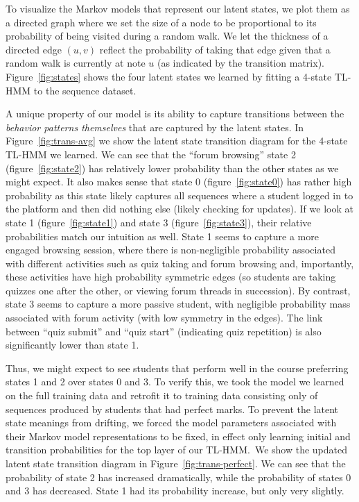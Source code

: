 To visualize the Markov models that represent our latent states, we plot
them as a directed graph where we set the size of a node to be proportional
to its probability of being visited during a random walk.  We let the
thickness of a directed edge $(u, v)$ reflect the probability of taking
that edge given that a random walk is currently at note $u$ (as indicated
by the transition matrix). Figure~\ref{fig:states} shows the four latent
states we learned by fitting a 4-state TL-HMM to the \textretrieval{}
sequence dataset.

A unique property of our model is its ability to capture transitions
between the \emph{behavior patterns themselves} that are captured by the
latent states. In Figure~\ref{fig:trans-avg} we show the latent state
transition diagram for the 4-state TL-HMM we learned.
We can see that the ``forum browsing'' state 2 (figure~\ref{fig:state2})
has relatively lower probability than the other states as we might expect.
It also makes sense that state 0 (figure~\ref{fig:state0}) has rather high
probability as this state likely captures all sequences where a student
logged in to the platform and then did nothing else (likely checking for
updates). If we look at state 1 (figure~\ref{fig:state1}) and state 3
(figure~\ref{fig:state3}), their relative probabilities match our intuition
as well. State 1 seems to capture a more engaged browsing session, where
there is non-negligible probability associated with different activities
such as quiz taking and forum browsing and, importantly, these activities
have high probability symmetric edges (so students are taking quizzes one
after the other, or viewing forum threads in succession). By contrast,
state 3 seems to capture a more passive student, with negligible
probability mass associated with forum activity (with low symmetry in the
edges). The link between ``quiz submit'' and ``quiz start'' (indicating
quiz repetition) is also significantly lower than state 1.

Thus, we might expect to see students that perform well in the course
preferring states 1 and 2 over states 0 and 3. To verify this, we took the
model we learned on the full training data and retrofit it to training data
consisting only of sequences produced by students that had perfect marks.
To prevent the latent state meanings from drifting, we forced the model
parameters associated with their Markov model representations to be fixed,
in effect only learning initial and transition probabilities for the top
layer of our TL-HMM.\ We show the updated latent state transition diagram
in Figure~\ref{fig:trans-perfect}. We can see that the probability of state
2 has increased dramatically, while the probability of states 0 and 3 has
decreased. State 1 had its probability increase, but only very slightly.


